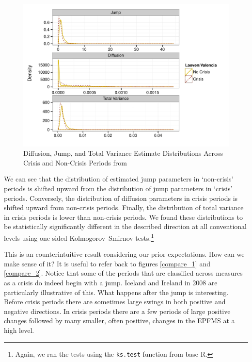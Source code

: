 \documentclass[]{article}
\begin{document}
\begin{figure}
    \caption{Diffusion, Jump, and Total Variance Estimate Distributions Across Crisis and Non-Crisis Periods from \cite{laeven2013}}
    \label{comp_jump_diff}
    \begin{center}
        \includegraphics[scale=0.7]{analysis/figures/compare_jump_diffusion_basic.pdf}
    \end{center}
\end{figure}

We can see that the distribution of estimated jump parameters in `non-crisis' periods is shifted upward from the distribution of jump parameters in `crisis' periods. Conversely, the distribution of diffusion parameters in crisis periods is shifted upward from non-crisis periods. Finally, the distribution of total variance in crisis periods is lower than non-crisis periods. We found these distributions to be statistically significantly different in the described direction at all conventional levels using one-sided Kolmogorov–Smirnov tests.\footnote{Again, we ran the tests using the \texttt{ks.test} function from base R.}

This is an counterintuitive result considering our prior expectations. How can we make sense of it? It is useful to refer back to figures \ref{compare_1} and \ref{compare_2}. Notice that some of the periods that are classified across measures as a crisis do indeed begin with a jump. Iceland and Ireland in 2008 are particularly illustrative of this. What happens after the jump is interesting. Before crisis periods there are sometimes large swings in both positive and negative directions. In crisis periods there are a few periods of large positive changes followed by many smaller, often positive, changes in the EPFMS at a high level.
\end{document}
